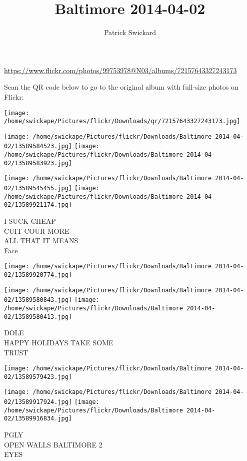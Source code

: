 \documentclass[10pt,letterpaper]{article}
\title{Baltimore 2014-04-02}
\author{Patrick Swickard}
\date{}
\begin{document}
\maketitle

\url{https://www.flickr.com/photos/99753978@N03/albums/72157643327243173}

Scan the QR code below to go to the original album with full-size photos on Flickr:

\texttt{[image: /home/swickape/Pictures/flickr/Downloads/qr/72157643327243173.jpg]}
\pagebreak

\texttt{[image: /home/swickape/Pictures/flickr/Downloads/Baltimore 2014-04-02/13589584523.jpg]}
\texttt{[image: /home/swickape/Pictures/flickr/Downloads/Baltimore 2014-04-02/13589583923.jpg]}

\texttt{[image: /home/swickape/Pictures/flickr/Downloads/Baltimore 2014-04-02/13589545455.jpg]}
\texttt{[image: /home/swickape/Pictures/flickr/Downloads/Baltimore 2014-04-02/13589921174.jpg]}

I SUCK CHEAP\\
CUIT COUR MORE\\
ALL THAT IT MEANS\\
Face
\pagebreak

\texttt{[image: /home/swickape/Pictures/flickr/Downloads/Baltimore 2014-04-02/13589920774.jpg]}

\vspace{0.25in}
\texttt{[image: /home/swickape/Pictures/flickr/Downloads/Baltimore 2014-04-02/13589580843.jpg]}
\texttt{[image: /home/swickape/Pictures/flickr/Downloads/Baltimore 2014-04-02/13589580413.jpg]}

DOLE\\
HAPPY HOLIDAYS TAKE SOME\\
TRUST
\pagebreak

\texttt{[image: /home/swickape/Pictures/flickr/Downloads/Baltimore 2014-04-02/13589579423.jpg]}

\vspace{0.25in}
\texttt{[image: /home/swickape/Pictures/flickr/Downloads/Baltimore 2014-04-02/13589917924.jpg]}
\texttt{[image: /home/swickape/Pictures/flickr/Downloads/Baltimore 2014-04-02/13589916834.jpg]}

PGLY\\
OPEN WALLS BALTIMORE 2\\
EYES
\pagebreak
\end{document}
